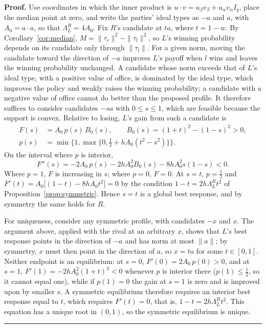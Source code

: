\documentclass[12pt,letterpaper]{article}
\newenvironment{proof}[1][Proof]{\noindent\textbf{#1.} }{\ \rule{0.5em}{0.5em}}
\begin{document}
\begin{proof}
Use coordinates in which the inner product is $u\cdot v=u_\beta v_\beta+u_\alpha v_\alpha I_q$, place the median point at zero, and write the parties' ideal types as $-a$ and $a$, with $A_0=a\cdot a$, so that $\Lambda_L^R=4A_0$. Fix $R$'s candidate at $ta$, where $t=1-w$. By Corollary~\ref{cor:median}, $M=\|\tau_r\|^2-\|\tau_l\|^2$, so $L$'s winning probability depends on its candidate only through $\|\tau_l\|$. For a given norm, moving the candidate toward the direction of $-a$ improves $L$'s payoff when $l$ wins and leaves the winning probability unchanged. A candidate whose norm exceeds that of $L$'s ideal type, with a positive value of office, is dominated by the ideal type, which improves the policy and weakly raises the winning probability; a candidate with a negative value of office cannot do better than the proposed profile. It therefore suffices to consider candidates $-sa$ with $0\le s\le1$, which are feasible because the support is convex. Relative to losing, $L$'s gain from such a candidate is
\begin{align*}
F(s)&=A_0\,p(s)\,B_0(s),
\qquad
B_0(s)=(1+t)^2-(1-s)^2>0,\\
p(s)&=\min\Big\{1,\max\big\{0,\tfrac12+hA_0(t^2-s^2)\big\}\Big\}.
\end{align*}
On the interval where $p$ is interior,
\[
F''(s)=-2A_0\,p(s)-2hA_0^2B_0(s)-8hA_0^2s(1-s)<0.
\]
Where $p=1$, $F$ is increasing in $s$; where $p=0$, $F=0$. At $s=t$, $p=\tfrac12$ and $F'(t)=A_0\big[(1-t)-8hA_0t^2\big]=0$ by the condition $1-t=2h\Lambda_L^Rt^2$ of Proposition~\ref{prop:symmetric}. Hence $s=t$ is a global best response, and by symmetry the same holds for $R$.

For uniqueness, consider any symmetric profile, with candidates $-x$ and $x$. The argument above, applied with the rival at an arbitrary $x$, shows that $L$'s best response points in the direction of $-a$ and has norm at most $\|a\|$; by symmetry, $x$ must then point in the direction of $a$, so $x=ta$ for some $t\in[0,1]$. Neither endpoint is an equilibrium: at $s=0$, $F'(0)=2A_0\,p(0)>0$, and at $s=1$, $F'(1)=-2hA_0^2(1+t)^2<0$ whenever $p$ is interior there ($p(1)\le\tfrac12$, so it cannot equal one), while if $p(1)=0$ the gain at $s=1$ is zero and is improved upon by smaller $s$. A symmetric equilibrium therefore requires an interior best response equal to $t$, which requires $F'(t)=0$, that is, $1-t=2h\Lambda_L^Rt^2$. This equation has a unique root in $(0,1)$, so the symmetric equilibrium is unique.
\end{proof}
\end{document}
